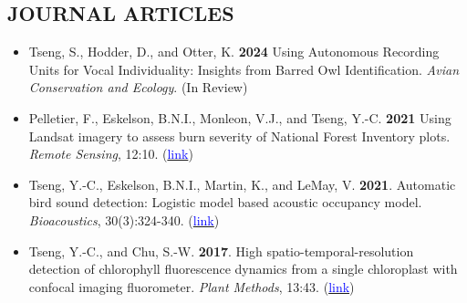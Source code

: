 \documentclass[11pt,letterpaper,sans]{moderncv}        %
\begin{document}
\subsection{JOURNAL ARTICLES}
\begin{itemize}

\item{Tseng, S., Hodder, D., and Otter, K. \textbf{2024} Using Autonomous Recording Units for Vocal Individuality: Insights from Barred Owl Identification. \textit{Avian Conservation and Ecology}. (In Review)}
\vspace{3pt}

\item{Pelletier, F., Eskelson, B.N.I., Monleon, V.J., and Tseng, Y.-C. \textbf{2021} Using Landsat imagery to assess burn severity of National Forest Inventory plots. \textit{Remote Sensing}, 12:10. (\href{https://www.mdpi.com/2072-4292/13/10/1935}{\textcolor{blue}{link}})}
\vspace{3pt}

\item{Tseng, Y.-C., Eskelson, B.N.I., Martin, K., and LeMay, V. \textbf{2021}. Automatic bird sound detection: Logistic model based acoustic occupancy model. \textit{Bioacoustics}, 30(3):324-340. (\href{https://www.tandfonline.com/doi/abs/10.1080/09524622.2020.1730241}{\textcolor{blue}{link}})}
\vspace{3pt}

\item{Tseng, Y.-C., and Chu, S.-W. \textbf{2017}. High spatio-temporal-resolution detection of chlorophyll fluorescence dynamics from a single chloroplast with confocal imaging fluorometer. \textit{Plant Methods}, 13:43. (\href{https://doi.org/10.1186/s13007-017-0194-2}{\textcolor{blue}{link}})}

\end{itemize}

\end{document}
